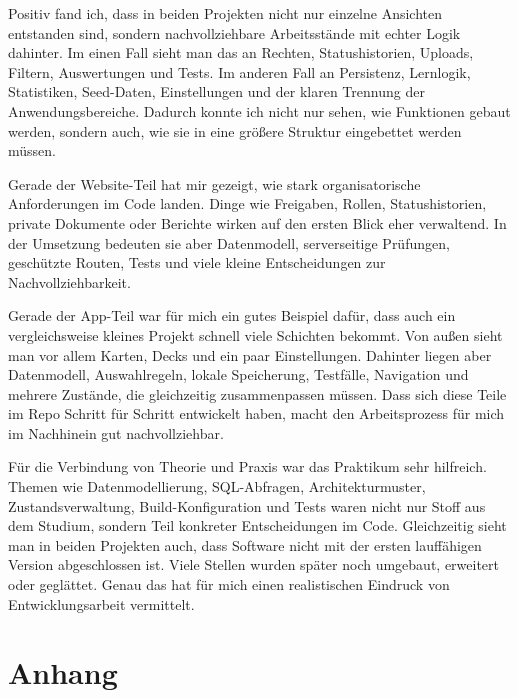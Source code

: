 \documentclass{Vorlage}
\begin{document}
Positiv fand ich, dass in beiden Projekten nicht nur einzelne Ansichten entstanden sind, sondern nachvollziehbare Arbeitsst\"ande mit echter Logik dahinter. Im einen Fall sieht man das an Rechten, Statushistorien, Uploads, Filtern, Auswertungen und Tests. Im anderen Fall an Persistenz, Lernlogik, Statistiken, Seed-Daten, Einstellungen und der klaren Trennung der Anwendungsbereiche. Dadurch konnte ich nicht nur sehen, wie Funktionen gebaut werden, sondern auch, wie sie in eine gr\"o\ss{}ere Struktur eingebettet werden m\"ussen.

Gerade der Website-Teil hat mir gezeigt, wie stark organisatorische Anforderungen im Code landen. Dinge wie Freigaben, Rollen, Statushistorien, private Dokumente oder Berichte wirken auf den ersten Blick eher verwaltend. In der Umsetzung bedeuten sie aber Datenmodell, serverseitige Pr\"ufungen, gesch\"utzte Routen, Tests und viele kleine Entscheidungen zur Nachvollziehbarkeit.

Gerade der App-Teil war f\"ur mich ein gutes Beispiel daf\"ur, dass auch ein vergleichsweise kleines Projekt schnell viele Schichten bekommt. Von au\ss{}en sieht man vor allem Karten, Decks und ein paar Einstellungen. Dahinter liegen aber Datenmodell, Auswahlregeln, lokale Speicherung, Testf\"alle, Navigation und mehrere Zust\"ande, die gleichzeitig zusammenpassen m\"ussen. Dass sich diese Teile im Repo Schritt f\"ur Schritt entwickelt haben, macht den Arbeitsprozess f\"ur mich im Nachhinein gut nachvollziehbar.

F\"ur die Verbindung von Theorie und Praxis war das Praktikum sehr hilfreich. Themen wie Datenmodellierung, SQL-Abfragen, Architekturmuster, Zustandsverwaltung, Build-Konfiguration und Tests waren nicht nur Stoff aus dem Studium, sondern Teil konkreter Entscheidungen im Code. Gleichzeitig sieht man in beiden Projekten auch, dass Software nicht mit der ersten lauff\"ahigen Version abgeschlossen ist. Viele Stellen wurden sp\"ater noch umgebaut, erweitert oder gegl\"attet. Genau das hat f\"ur mich einen realistischen Eindruck von Entwicklungsarbeit vermittelt.


\newpage

\section{Anhang}
\end{document}
